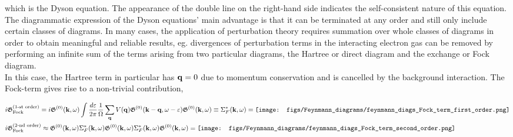\documentclass{homework}
\begin{document}
which is the Dyson equation. The appearance of the double line on the right-hand side indicates the self-consistent nature of this equation. The diagrammatic expression of the Dyson equations' main advantage is that it can be terminated at any order and still only include certain classes of diagrams. In many cases, the application of perturbation theory requires summation over whole classes of diagrams in order to obtain meaningful and reliable results, eg. divergences of perturbation terms in the interacting electron gas can be removed by performing an infinite sum of the terms arising from two particular diagrams, the Hartree or direct diagram and the exchange or Fock diagram. 
\\

In this case, the Hartree term in particular has ${\bf q} = 0$ due to momentum conservation and is cancelled by the background interaction. The Fock-term gives rise to a non-trivial contribution, 

\begin{equation}
\begin{split}
    &i\mathfrak{G}_{\textnormal{Fock}}^{(1\textnormal{-st order})} = i \mathfrak{G}^{(0)}({\bf k}, \omega) \int \frac{d\varepsilon}{2\pi} \frac{1}{\Omega} \sum_{{\bf q}} V({\bf q}) \mathfrak{G}^{(0)}({\bf k-q}, \omega - \varepsilon)  \mathfrak{G}^{(0)}({\bf k}, \omega) \equiv \Sigma^{*}_F({\bf k}, \omega) = \texttt{[image: figs/Feynmann\_diagrams/feynmann\_diags\_Fock\_term\_first\_order.png]} \\
    &i\mathfrak{G}_{\textnormal{Fock}}^{(2\textnormal{-nd order})} \approx \mathfrak{G}^{(0)}({\bf k}, \omega) \Sigma^{*}_F({\bf k}, \omega) \mathfrak{G}^{(0)}({\bf k}, \omega) \Sigma^{*}_F({\bf k}, \omega) \mathfrak{G}^{(0)}({\bf k}, \omega) = \texttt{[image: figs/Feynmann\_diagrams/feynmann\_diags\_Fock\_term\_second\_order.png]} \\
\end{split}
\end{equation}


\end{document}
